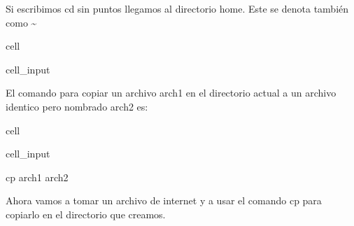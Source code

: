 \documentclass[letterpaper,10pt,english]{jupyterBook}
\begin{document}
\begin{DUlineblock}{0em}
\item[] 
\end{DUlineblock}

\sphinxAtStartPar
Si escribimos  cd   sin puntos llegamos al directorio home. Este se denota también como   \textasciitilde{}  

\begin{sphinxuseclass}{cell}\begin{sphinxVerbatimInput}

\begin{sphinxuseclass}{cell_input}
\begin{sphinxVerbatim}[commandchars=\\\{\}]
 
\end{sphinxVerbatim}

\end{sphinxuseclass}\end{sphinxVerbatimInput}

\end{sphinxuseclass}
\begin{DUlineblock}{0em}
\item[] 
\end{DUlineblock}

\begin{DUlineblock}{0em}
\item[] 
\end{DUlineblock}

\sphinxAtStartPar
El comando para copiar un archivo arch1 en el directorio actual a un archivo identico pero nombrado arch2 es:

\begin{sphinxuseclass}{cell}\begin{sphinxVerbatimInput}

\begin{sphinxuseclass}{cell_input}
\begin{sphinxVerbatim}[commandchars=\\\{\}]
\PYGZdl{} cp arch1 arch2
\end{sphinxVerbatim}

\end{sphinxuseclass}\end{sphinxVerbatimInput}

\end{sphinxuseclass}
\sphinxAtStartPar
Ahora vamos a tomar un archivo de internet y a usar el comando cp para copiarlo en el directorio que creamos.
\end{document}
